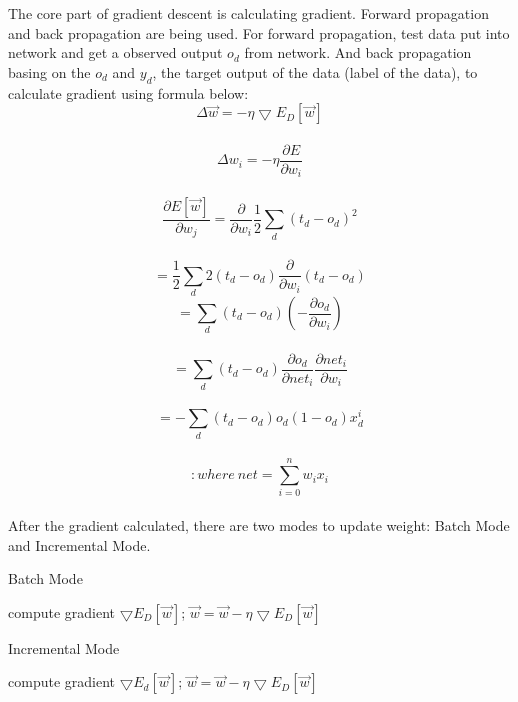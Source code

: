 \documentclass[a4paper]{article}
\begin{document}
The core part of gradient descent is calculating gradient. Forward propagation and back propagation are being used. For forward propagation, test data put into network and get a observed output $o_{d}$ from network. And back propagation basing on the $o_{d}$ and $y_{d}$, the target output of the data (label of the data), to calculate gradient using formula below:\\
$$\Delta \overrightarrow{w} =  - \eta \bigtriangledown E_{D}[\overrightarrow{w}]$$\\
$$\Delta w_{i} =  - \eta \frac{\partial E}{\partial w_{i}}$$\\
$$\frac{\partial E[\overrightarrow{w}]}{\partial w_{j}} =   \frac{\partial }{\partial w_{i}}\frac{1}{2} \sum_{d}(t_{d}-o_{d})^{2}$$\\
$$=   \frac{1}{2} \sum_{d} 2(t_{d}-o_{d})\frac{\partial }{\partial w_{i}}(t_{d}-o_{d})$$
$$=   \sum_{d} (t_{d}-o_{d})(-\frac{\partial o_{d}}{\partial w_{i}})$$\\
$$=   \sum_{d} (t_{d}-o_{d})\frac{\partial o_{d}}{\partial net_{i}}\frac{\partial net_{i}}{\partial w_{i}}$$\\
$$=   -\sum_{d} (t_{d}-o_{d})o_{d}(1-o_{d})x_{d}^i$$\\
$$:where \ net=   \sum_{i=0}^{n} w_{i}x_{i}$$\\

After the gradient calculated, there are two modes to update weight: Batch Mode and Incremental Mode.
\begin{algorithm}[H]  
  \caption{Batch Mode}  
  \label{alg::conjugateGradient}  
  \begin{algorithmic}[1]  
    \Repeat  
      \State compute gradient $\bigtriangledown E_{D}[\overrightarrow{w}]$;  
      \State $\overrightarrow{w} = \overrightarrow{w} - \eta \bigtriangledown E_{D}[\overrightarrow{w}]$  
  \end{algorithmic}  
\end{algorithm} 
 \begin{algorithm}[H]  
  \caption{Incremental Mode}  
  \label{alg::conjugateGradient}  
  \begin{algorithmic}[1]  
    \Repeat  
       \State compute gradient $\bigtriangledown E_{d}[\overrightarrow{w}]$;  
       \State $\overrightarrow{w} = \overrightarrow{w} - \eta \bigtriangledown E_{D}[\overrightarrow{w}]$  
      \EndFor 
  \end{algorithmic}  
\end{algorithm}
\end{document}
